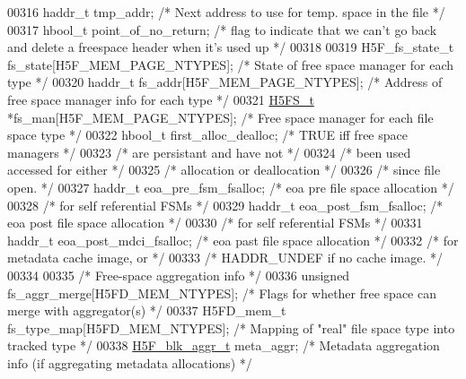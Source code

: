 \begin{DoxyCode}
00316     haddr\_t tmp\_addr;       \textcolor{comment}{/* Next address to use for temp. space in the file */}
00317     hbool\_t point\_of\_no\_return;             \textcolor{comment}{/* flag to indicate that we can't go back and delete a
       freespace header when it's used up */}
00318 
00319     H5F\_fs\_state\_t fs\_state[H5F\_MEM\_PAGE\_NTYPES];   \textcolor{comment}{/* State of free space manager for each type */}
00320     haddr\_t fs\_addr[H5F\_MEM\_PAGE\_NTYPES];           \textcolor{comment}{/* Address of free space manager info for each type */}
00321     \hyperlink{struct_h5_f_s__t}{H5FS\_t} *fs\_man[H5F\_MEM\_PAGE\_NTYPES];            \textcolor{comment}{/* Free space manager for each file space type */}
00322     hbool\_t first\_alloc\_dealloc;            \textcolor{comment}{/* TRUE iff free space managers   */}
00323                                             \textcolor{comment}{/* are persistant and have not    */}
00324                                             \textcolor{comment}{/* been used accessed for either  */}
00325                                             \textcolor{comment}{/* allocation or deallocation     */}
00326                                             \textcolor{comment}{/* since file open.               */}
00327     haddr\_t eoa\_pre\_fsm\_fsalloc;        \textcolor{comment}{/* eoa pre file space allocation  */}
00328                                             \textcolor{comment}{/* for self referential FSMs      */}
00329     haddr\_t eoa\_post\_fsm\_fsalloc;           \textcolor{comment}{/* eoa post file space allocation */}
00330                                             \textcolor{comment}{/* for self referential FSMs      */}
00331     haddr\_t eoa\_post\_mdci\_fsalloc;          \textcolor{comment}{/* eoa past file space allocation */}
00332                                             \textcolor{comment}{/* for metadata cache image, or   */}
00333                                             \textcolor{comment}{/* HADDR\_UNDEF if no cache image. */}
00334 
00335     \textcolor{comment}{/* Free-space aggregation info */}
00336     \textcolor{keywordtype}{unsigned} fs\_aggr\_merge[H5FD\_MEM\_NTYPES];    \textcolor{comment}{/* Flags for whether free space can merge with
       aggregator(s) */}
00337     H5FD\_mem\_t fs\_type\_map[H5FD\_MEM\_NTYPES];    \textcolor{comment}{/* Mapping of "real" file space type into tracked type */}
00338     \hyperlink{struct_h5_f__blk__aggr__t}{H5F\_blk\_aggr\_t} meta\_aggr;             \textcolor{comment}{/* Metadata aggregation info (if aggregating
       metadata allocations) */}

\end{DoxyCode}
